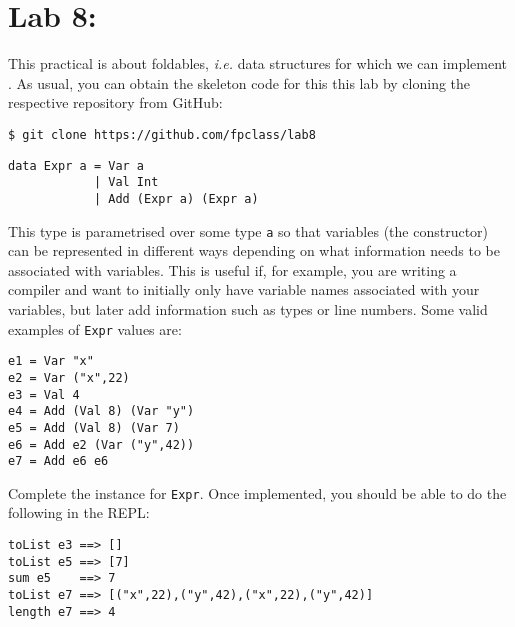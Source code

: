 \section{Lab 8: \practicalSevenTitle}

This practical is about foldables, \emph{i.e.} data structures for which we can implement . As usual, you can obtain the skeleton code for this this lab by cloning the respective repository from GitHub:
\begin{verbatim}
$ git clone https://github.com/fpclass/lab8
\end{verbatim}

\taskLine 

\begin{verbatim}
data Expr a = Var a
            | Val Int
            | Add (Expr a) (Expr a)
\end{verbatim}
This type is parametrised over some type \texttt{\small a} so that variables (the  constructor) can be represented in different ways depending on what information needs to be associated with variables. This is useful if, for example, you are writing a compiler and want to initially only have variable names associated with your variables, but later add information such as types or line numbers. Some valid examples of \texttt{\small Expr} values are:
\begin{verbatim}
e1 = Var "x"
e2 = Var ("x",22)
e3 = Val 4 
e4 = Add (Val 8) (Var "y")
e5 = Add (Val 8) (Var 7)
e6 = Add e2 (Var ("y",42))
e7 = Add e6 e6
\end{verbatim}
Complete the  instance for \texttt{\small Expr}. Once implemented, you should be able to do the following in the REPL:
\begin{verbatim}
toList e3 ==> []
toList e5 ==> [7]
sum e5    ==> 7
toList e7 ==> [("x",22),("y",42),("x",22),("y",42)]
length e7 ==> 4
\end{verbatim}

\taskLine

